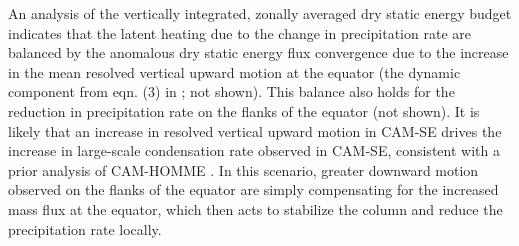 An analysis of the vertically integrated, zonally averaged dry static energy budget indicates that the latent heating due to the change in precipitation rate are balanced by the anomalous dry static energy flux convergence due to the increase in the mean resolved vertical upward motion at the equator (the dynamic component from eqn. (3) in \cite{MO2011NATUREC}; not shown). This balance also holds for the reduction in precipitation rate on the flanks of the equator (not shown). It is likely that an increase in resolved vertical upward motion in CAM-SE drives the increase in large-scale condensation rate observed in CAM-SE, consistent with a prior analysis of CAM-HOMME \citep{OETAL2016JAMES}. In this scenario, greater downward motion observed on the flanks of the equator are simply compensating for the increased mass flux at the equator, which then acts to stabilize the column and reduce the precipitation rate locally.

